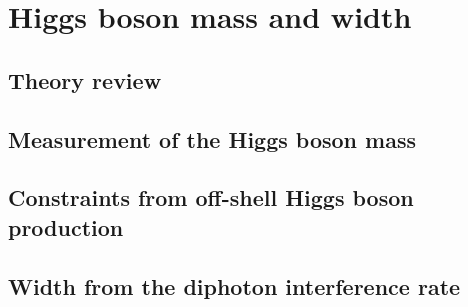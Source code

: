 \documentclass[../report.tex]{subfiles}
\providecommand{\main}{..}
\begin{document}
\section{Higgs boson mass and width}\label{sec5}

\subsection{Theory review}



\subsection{Measurement of the Higgs boson mass}



\subsection{Constraints from off-shell Higgs boson production}

\label{sec:5_offshell}

\subsection{Width from the diphoton interference rate}
\label{sec:5_interference_real}






%
%
\end{document}
